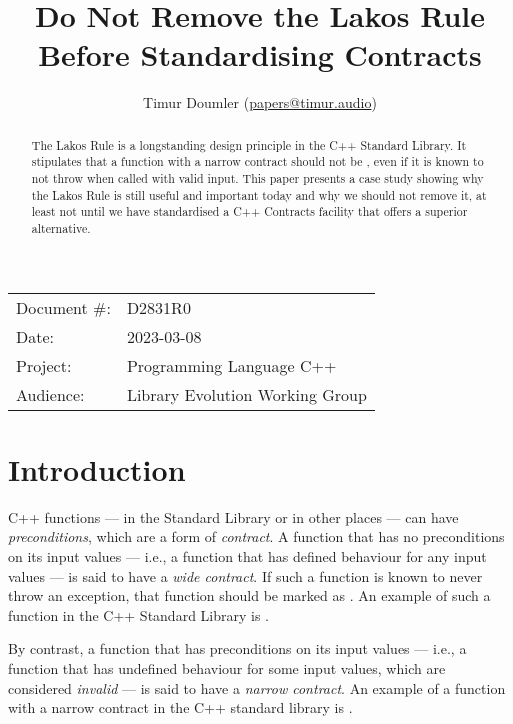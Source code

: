 


\title{Do Not Remove the Lakos Rule Before Standardising Contracts}
\author{ Timur Doumler \small(\href{mailto:papers@timur.audio}{papers@timur.audio})  }
\date{}
\maketitle

\begin{tabular}{ll}
Document \#: & D2831R0 \\
Date: &2023-03-08 \\
Project: & Programming Language C++ \\
Audience: & Library Evolution Working Group
\end{tabular}

\begin{abstract}
The Lakos Rule is a longstanding design principle in the C++ Standard Library. 
It stipulates that a function with a narrow contract should not be , even if it is known to not throw when called with valid input. This paper presents a case study showing why the Lakos Rule is still useful and important today and why we should not remove it, at least not until we have standardised a C++ Contracts facility that offers a superior alternative.
\end{abstract}

\section{Introduction}
\label{sec:intro}

C++ functions --- in the Standard Library or in other places --- can have \emph{preconditions}, which are a form of \emph{contract}. A function that has no preconditions on its input values --- i.e., a function that has defined behaviour for any input values --- is said to have a \emph{wide contract}.  If such a function is known to never throw an exception, that function should be marked as . An example of such a function in the C++ Standard Library is .

By contrast, a function that has preconditions on its input values --- i.e., a function that has undefined behaviour for some input values, which are considered \emph{invalid} --- is said to have a \emph{narrow contract}. An example of a function with a narrow contract in the C++ standard library is .

